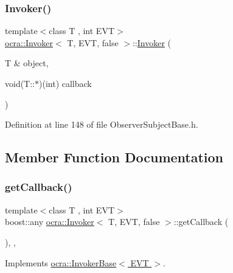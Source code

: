 \subsubsection{\texorpdfstring{Invoker()}{Invoker()}}
{\footnotesize\ttfamily template$<$class T , int E\+VT$>$ \\
\hyperlink{classocra_1_1Invoker}{ocra\+::\+Invoker}$<$ T, E\+VT, false $>$\+::\hyperlink{classocra_1_1Invoker}{Invoker} (\begin{DoxyParamCaption}\item[{T \&}]{object,  }\item[{void(T\+::$\ast$)(int)}]{callback }\end{DoxyParamCaption})\hspace{0.3cm}{\ttfamily [inline]}}



Definition at line 148 of file Observer\+Subject\+Base.\+h.



\subsection{Member Function Documentation}
\hypertarget{classocra_1_1Invoker_3_01T_00_01EVT_00_01false_01_4_a459bd95f3eae2d06b9167fd98c1c7e22}{}\label{classocra_1_1Invoker_3_01T_00_01EVT_00_01false_01_4_a459bd95f3eae2d06b9167fd98c1c7e22} 
\subsubsection{\texorpdfstring{get\+Callback()}{getCallback()}}
{\footnotesize\ttfamily template$<$class T , int E\+VT$>$ \\
boost\+::any \hyperlink{classocra_1_1Invoker}{ocra\+::\+Invoker}$<$ T, E\+VT, false $>$\+::get\+Callback (\begin{DoxyParamCaption}{ }\end{DoxyParamCaption})\hspace{0.3cm}{\ttfamily [inline]}, {\ttfamily [protected]}, {\ttfamily [virtual]}}



Implements \hyperlink{classocra_1_1InvokerBase_aab9488dbb26120ccfa7c77be11c01ba9}{ocra\+::\+Invoker\+Base$<$ E\+V\+T $>$}.



